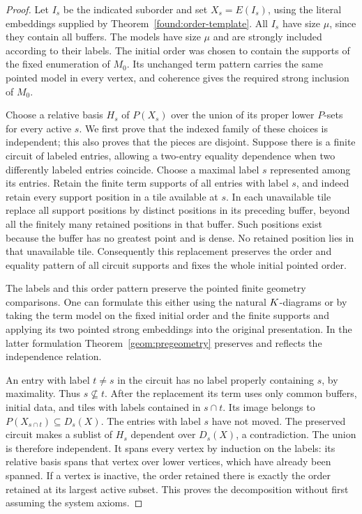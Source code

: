 \begin{proof}
Let $I_s$ be the indicated suborder and set $X_s=E(I_s)$, using the
literal embeddings supplied by Theorem~\ref{found:order-template}.
All $I_s$ have size $\mu$, since they contain all buffers.  The
models have size $\mu$ and are strongly included according to their
labels.  The initial order was chosen to contain the supports of the
fixed enumeration of $M_0$.  Its unchanged term pattern carries the
same pointed model in every vertex, and coherence gives the required
strong inclusion of $M_0$.

Choose a relative basis $H_s$ of $P(X_s)$ over the union of its
proper lower $P$-sets for every active $s$.  We first prove that the
indexed family of these choices is independent; this also proves
that the pieces are disjoint.  Suppose there is a finite circuit
of labeled entries, allowing a two-entry equality dependence when
two differently labeled entries coincide.  Choose a maximal label $s$ represented among its
entries.  Retain the finite term supports of all entries with label
$s$, and indeed retain every support position in a tile available
at $s$.  In each unavailable tile replace all support positions by
distinct positions in its preceding buffer, beyond all the finitely
many retained positions in that buffer.  Such positions exist because
the buffer has no greatest point and is dense.  No retained position
lies in that unavailable tile.  Consequently this replacement
preserves the order and equality pattern of all circuit supports and
fixes the whole initial pointed order.

The labels and this order pattern preserve the pointed finite
geometry comparisons.  One can formulate this either using the
natural $K$-diagrams or by taking the term model on the fixed initial
order and the finite supports and applying its two pointed strong
embeddings into the original presentation.  In the latter formulation
Theorem~\ref{geom:pregeometry} preserves and reflects the
independence relation.

An entry with label $t\ne s$ in the circuit has no label properly
containing $s$, by maximality.  Thus $s\nsubseteq t$.  After the
replacement its term uses only common buffers, initial data, and
tiles with labels contained in $s\cap t$.  Its image belongs to
$P(X_{s\cap t})\subseteq D_s(X)$.  The entries with label $s$ have
not moved.  The preserved circuit makes a sublist of $H_s$ dependent
over $D_s(X)$, a contradiction.  The union is therefore independent.
It spans every vertex by induction on the labels: its relative basis
spans that vertex over lower vertices, which have already been
spanned.  If a vertex is inactive, the order retained there is exactly
the order retained at its largest active subset.  This proves the
decomposition without first assuming the system axioms.


\end{proof}
